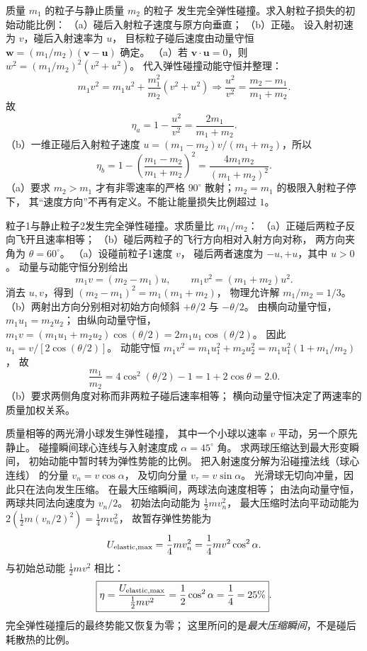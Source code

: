 质量 $m_1$ 的粒子与静止质量 $m_2$ 的粒子
发生完全弹性碰撞。求入射粒子损失的初始动能比例：
（a）碰后入射粒子速度与原方向垂直；
（b）正碰。
\exsolution
设入射初速为 $v$，碰后入射速率为 $u$，
目标粒子碰后速度由动量守恒
$\bm w=(m_1/m_2)(\bm v-\bm u)$ 确定。
（a）若 $\bm v\cdot\bm u=0$，则
$w^2=(m_1/m_2)^2(v^2+u^2)$。
代入弹性碰撞动能守恒并整理：
\[
m_1v^2=m_1u^2+
\frac{m_1^2}{m_2}(v^2+u^2)
\Longrightarrow
\frac{u^2}{v^2}=\frac{m_2-m_1}{m_1+m_2}.
\]
故
\[
\boxed{\eta_a=1-\frac{u^2}{v^2}
=\frac{2m_1}{m_1+m_2}}.
\]
（b）一维正碰后入射粒子速度
$u=(m_1-m_2)v/(m_1+m_2)$，所以
\[
\boxed{\eta_b=
1-\left(\frac{m_1-m_2}{m_1+m_2}\right)^2
=\frac{4m_1m_2}{(m_1+m_2)^2}}.
\]
\excheck （a）要求 $m_2>m_1$ 才有非零速率的严格
$90^\circ$ 散射；$m_2=m_1$ 的极限入射粒子停下，
其“速度方向”不再有定义。不能让能量损失比例超过 $1$。

粒子1与静止粒子2发生完全弹性碰撞。求质量比 $m_1/m_2$：
（a）正碰后两粒子反向飞开且速率相等；
（b）碰后两粒子的飞行方向相对入射方向对称，
两方向夹角为 $\theta=60^\circ$。
\exsolution
（a）设碰前粒子1速度 $v$，
碰后两者速度为 $-u,+u$，其中 $u>0$。
动量与动能守恒分别给出
\[
m_1v=(m_2-m_1)u,\qquad
m_1v^2=(m_1+m_2)u^2.
\]
消去 $u,v$，得到
$(m_2-m_1)^2=m_1(m_1+m_2)$，
物理允许解
$\boxed{m_1/m_2=1/3}$。
（b）两射出方向分别相对初始方向倾斜
$+\theta/2$ 与 $-\theta/2$。
由横向动量守恒，
$m_1u_1=m_2u_2$；
由纵向动量守恒，
$m_1v=(m_1u_1+m_2u_2)\cos(\theta/2)
=2m_1u_1\cos(\theta/2)$。
因此 $u_1=v/[2\cos(\theta/2)]$。
动能守恒
$m_1v^2=m_1u_1^2+m_2u_2^2
=m_1u_1^2(1+m_1/m_2)$，
故
\[
\boxed{\frac{m_1}{m_2}=4\cos^2(\theta/2)-1
=1+2\cos\theta=2.0}.
\]
\excheck （b）要求两侧角度对称而非两粒子碰后速率相等；
横向动量守恒决定了两速率的质量加权关系。

质量相等的两光滑小球发生弹性碰撞，
其中一个小球以速率 $v$ 平动，另一个原先静止。
碰撞瞬间球心连线与入射速度成
$\alpha=45^\circ$ 角。
求两球压缩达到最大形变瞬间，
初始动能中暂时转为弹性势能的比例。
\exsolution
把入射速度分解为沿碰撞法线（球心连线）
的分量 $v_n=v\cos\alpha$，
及切向分量 $v_\tau=v\sin\alpha$。
光滑球无切向冲量，因此只在法向发生压缩。
在最大压缩瞬间，两球法向速度相等；
由法向动量守恒，两球共同法向速度为 $v_n/2$。
初始法向动能为 $\tfrac12mv_n^2$，
最大压缩时法向平动动能为
$2(\tfrac12 m(v_n/2)^2)=\tfrac14mv_n^2$，
故暂存弹性势能为
\[
U_{\rm elastic,max}=\frac14mv_n^2
=\frac14mv^2\cos^2\alpha .
\]
与初始总动能 $\tfrac12 mv^2$ 相比：
\[
\boxed{\eta=
\frac{U_{\rm elastic,max}}{\tfrac12 mv^2}
=\frac12\cos^2\alpha
=\frac14=25\%}.
\]
\excheck 完全弹性碰撞后的最终势能又恢复为零；
这里所问的是\emph{最大压缩瞬间}，不是碰后耗散热的比例。
